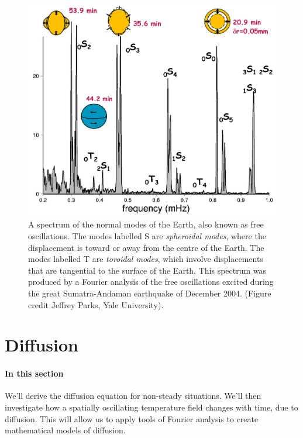 \documentclass[11pt,twoside,a4paper]{article}
\begin{document}
\begin{figure}[ht]
  \centering
  \includegraphics[width=\textwidth]{../figs/L16/NormalModeSpectrum}
  \caption{A spectrum of the normal modes of the Earth, also known as
    free oscillations. The modes labelled S are \textit{spheroidal
      modes}, where the displacement is toward or away from the centre
    of the Earth. The modes labelled T are \textit{toroidal modes},
    which involve displacements that are tangential to the surface of
    the Earth.  This spectrum was produced by a Fourier analysis of
    the free oscillations excited during the great Sumatra-Andaman
    earthquake of December 2004. (Figure credit Jeffrey Parks, Yale
    University).}
  \label{fig:freeosc}
\end{figure}


\section{Diffusion}
\label{sec:diffusion_2}

\paragraph{In this section} We'll derive the diffusion equation for
non-steady situations.  We'll then investigate how a spatially
oscillating temperature field changes with time, due to diffusion.
This will allow us to apply tools of Fourier analysis to create
mathematical models of diffusion.
\end{document}
